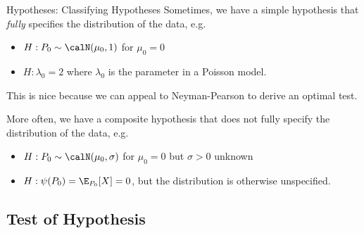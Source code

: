 \documentclass[aspectratio=169, handout]{beamer}
\begin{document}
{\footnotesize
\begin{frame}{Hypotheses: Classifying Hypotheses}
Sometimes, we have a \alert{simple hypothesis} that \emph{fully}
specifies the distribution of the data, e.g.
\begin{itemize}
  \item $H: P_0 \sim \calN(\mu_0,1)$ for $\mu_0=0$
  \item $H:\lambda_0=2$ where $\lambda_0$ is the parameter in a Poisson
    model.
\end{itemize}
\pause
This is nice because we can appeal to Neyman-Pearson to derive
an \alert{optimal} test.
\pause

More often, we have a \alert{composite hypothesis} that does not fully
specify the distribution of the data, e.g.
\begin{itemize}
  \item $H: P_0 \sim \calN(\mu_0,\sigma)$ for $\mu_0=0$ but $\sigma>0$
    unknown
  \pause
  \item $H: \psi(P_0)=\E_{P_0}[X]=0$, but the distribution is otherwise
    unspecified.
\end{itemize}
\end{frame}
}


\subsection{Test of Hypothesis}
\end{document}
